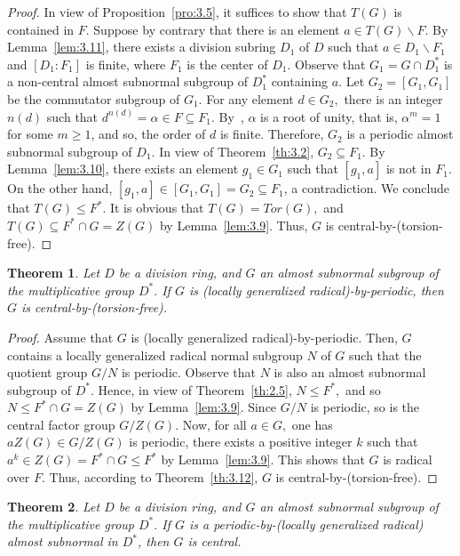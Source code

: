 \documentclass{amsart}
\newtheorem{theorem}{Theorem}[section]
\theoremstyle{definition}
\begin{document}
\begin{proof} In view of Proposition~\ref{pro:3.5}, it suffices to show that $T(G)$ is contained in $F.$ Suppose by contrary that there is an element $a\in T(G)\backslash F$. By Lemma~\ref{lem:3.11}, there exists a division subring $D_1$ of $D$ such that $a\in D_1\backslash F_1$ and $[D_1:F_1]$ is finite, where $F_1$ is the center of $D_1$. Observe that $G_1=G\cap D_1^*$ is a non-central almost subnormal subgroup of $D_1^*$ containing $a.$ Let $G_2=[G_1,G_1]$ be the commutator subgroup of $G_1.$ For any element $d\in G_2,$ there is an integer $n(d)$ such that  $d^{n(d)}=\alpha\in F\subseteq F_1.$ By~\cite[Sublemma]{Pa_Herstein_1978}, $\alpha$ is a root of unity, that is, $\alpha^m=1$ for some $m\geq 1$, and so, the order of $d$ is finite. Therefore, $G_2$ is a periodic almost subnormal subgroup of $D_1.$ In view of Theorem~\ref{th:3.2}, $G_2\subseteq F_1$. By Lemma~\ref{lem:3.10}, there exists an element $g_1\in G_1$ such that $[g_1,a]$ is not in $F_1.$ On the other hand, $[g_1,a]\in [G_1,G_1]= G_2\subseteq F_1$, a contradiction. We conclude that $T(G)\leq F^*.$ It is obvious that $T(G)=\mathit{Tor}(G),$ and $T(G)\subseteq F^*\cap G=Z(G)$ by Lemma~\ref{lem:3.9}. Thus, $G$ is central-by-(torsion-free). 
\end{proof}
\begin{theorem}\label{th:3.13} Let $D$ be a division ring, and $G$  an almost subnormal subgroup of the multiplicative group $D^*.$ If $G$ is (locally generalized radical)-by-periodic, then $G$ is central-by-(torsion-free).
\end{theorem}
\begin{proof} Assume that $G$ is (locally generalized radical)-by-periodic. Then, $G$ contains a locally generalized radical normal subgroup $N$ of $G$ such that the quotient group $G/N$ is periodic. Observe that $N$ is also an almost subnormal subgroup of $D^*.$ Hence, in view of Theorem~\ref{th:2.5}, $N\leq F^*,$ and so $N\leq F^*\cap G=Z(G)$ by Lemma~\ref{lem:3.9}. Since $G/N$ is periodic, so is the central factor group $G/Z(G).$ Now, for all $a\in G,$ one has $aZ(G)\in G/Z(G)$ is periodic, there exists a positive integer $k$ such that $a^k\in Z(G)=F^*\cap G\leq F^*$ by Lemma~\ref{lem:3.9}. This shows that $G$ is radical over $F.$ Thus, according to Theorem~\ref{th:3.12}, $G$ is central-by-(torsion-free).
\end{proof}
\begin{theorem}\label{th:3.14} Let $D$ be a division ring, and $G$ an almost subnormal subgroup of the multiplicative group $D^*.$ If $G$ is a periodic-by-(locally generalized radical) almost subnormal in $D^*$, then $G$ is central.
\end{theorem}
\end{document}
